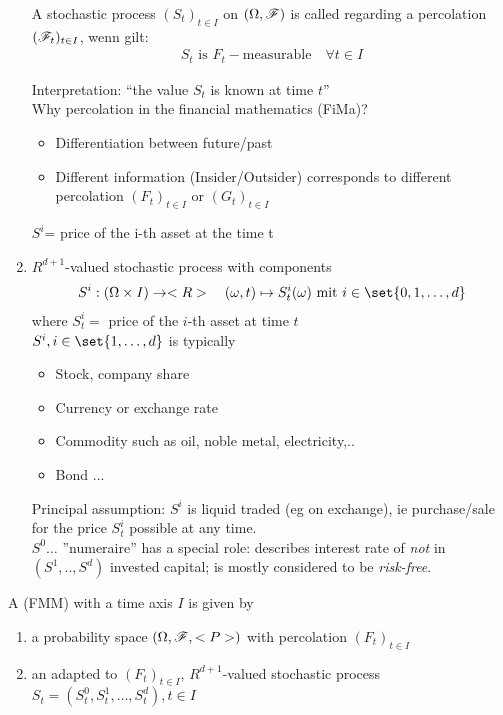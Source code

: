 \begin{enumerate}
	\begin{*example}
		A stochastic process  $(S_t)_{t\in I}$ on $(\Omega,\mathscr F)$ is called  regarding a percolation $(\mathscr F_t)_{t \in I}$, wenn gilt:
		\begin{align*}
			S_t \text{ is } F_t-\text{measurable} \quad \forall t \in I
		\end{align*}
	\end{*example}
	Interpretation: ``the value $S_t$ is known at time $t$''\\
	Why percolation in the financial mathematics (FiMa)?
	\begin{itemize}
		\item Differentiation between future/past
		\item Different information (Insider/Outsider) corresponds to different percolation $(F_t)_{t \in I}$ or $(G_t)_{t\in I}$
	\end{itemize}
	$S^i$= price of the i-th asset at the time t
	\item {} $R^{d+1}$-valued  stochastic process with components
	\begin{align*}
		S^i: (\O \times I) \to \R\quad (\omega,t) \mapsto S^i_t(\omega) \mit i \in \set{0,1,\dots,d}
	\end{align*} 
	where $S^i_t=$ price of the $i$-th asset at time $t$\\
	$S^i, i \in \set{1,\dots,d}$ is typically
	\begin{itemize}
		\item Stock, company share
		\item Currency or exchange rate
		\item Commodity such as oil, noble metal, electricity,..
		\item Bond ... 
	\end{itemize}
	Principal assumption: $S^i$ is liquid traded (eg on exchange), ie purchase/sale for the price $S_t^i$ possible at any time.\\
	
	$S^0\dots$ ''numeraire'' has a special role: describes interest rate of \emph{not} in $(S^1,..,S^d)$ invested capital; is mostly considered to be \emph{risk-free}.
\end{enumerate}

\begin{definition}
	A  (FMM) with a time axis $I$ is given by
	\begin{enumerate}
		\item a probability space $(\Omega, \mathscr F,<P>)$ with percolation $(F_t)_{t\in I}$
		\item an adapted to $(F_t)_{t \in I}$, $R^{d+1}$-valued stochastic process $S_t = (S^0_t, S_t^1, \dots, S^d_t),t \in I$
	\end{enumerate} 
\end{definition}

